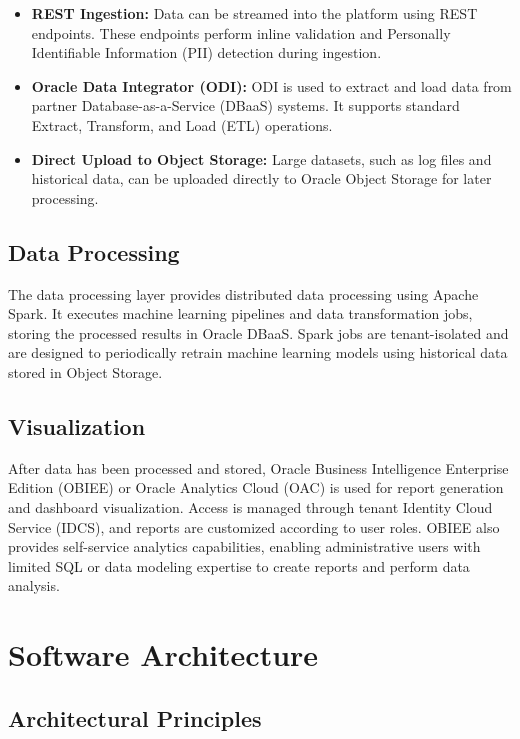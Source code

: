 \begin{itemize}
    \item \textbf{REST Ingestion:} Data can be streamed into the platform using REST endpoints. These endpoints perform inline validation and Personally Identifiable Information (PII) detection during ingestion.

    \item \textbf{Oracle Data Integrator (ODI):} ODI is used to extract and load data from partner Database-as-a-Service (DBaaS) systems. It supports standard Extract, Transform, and Load (ETL) operations.

    \item \textbf{Direct Upload to Object Storage:} Large datasets, such as log files and historical data, can be uploaded directly to Oracle Object Storage for later processing.
\end{itemize}

\subsection{Data Processing}

The data processing layer provides distributed data processing using Apache Spark. It executes machine learning pipelines and data transformation jobs, storing the processed results in Oracle DBaaS. Spark jobs are tenant-isolated and are designed to periodically retrain machine learning models using historical data stored in Object Storage.

\subsection{Visualization}

After data has been processed and stored, Oracle Business Intelligence Enterprise Edition (OBIEE) or Oracle Analytics Cloud (OAC) is used for report generation and dashboard visualization. Access is managed through tenant Identity Cloud Service (IDCS), and reports are customized according to user roles. OBIEE also provides self-service analytics capabilities, enabling administrative users with limited SQL or data modeling expertise to create reports and perform data analysis.

\section{Software Architecture}

\subsection{Architectural Principles}

